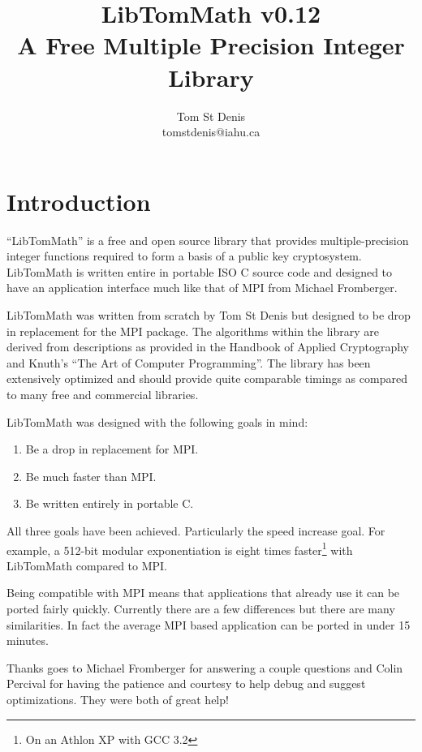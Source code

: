 \documentclass{article}
\begin{document}
\title{LibTomMath v0.12 \\ A Free Multiple Precision Integer Library}
\author{Tom St Denis \\ tomstdenis@iahu.ca}
\maketitle
\newpage

\section{Introduction}
``LibTomMath'' is a free and open source library that provides multiple-precision integer functions required to form a basis
of a public key cryptosystem.  LibTomMath is written entire in portable ISO C source code and designed to have an application
interface much like that of MPI from Michael Fromberger.  

LibTomMath was written from scratch by Tom St Denis but designed to be  drop in replacement for the MPI package.  The 
algorithms within the library are derived from descriptions as provided in the Handbook of Applied Cryptography and Knuth's
``The Art of Computer Programming''.  The library has been extensively optimized and should provide quite comparable 
timings as compared to many free and commercial libraries.

LibTomMath was designed with the following goals in mind:
\begin{enumerate}
\item Be a drop in replacement for MPI.
\item Be much faster than MPI.
\item Be written entirely in portable C.
\end{enumerate}

All three goals have been achieved.  Particularly the speed increase goal.  For example, a 512-bit modular exponentiation 
is eight times faster\footnote{On an Athlon XP with GCC 3.2} with LibTomMath compared to MPI.

Being compatible with MPI means that applications that already use it can be ported fairly quickly.  Currently there are 
a few differences but there are many similarities.  In fact the average MPI based application can be ported in under 15
minutes.  

Thanks goes to Michael Fromberger for answering a couple questions and Colin Percival for having the patience and courtesy to
help debug and suggest optimizations.  They were both of great help!
\end{document}
